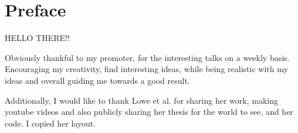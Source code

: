 \chapter*{Preface}
HELLO THERE!!

Obviously thankful to my promoter, for the interesting talks on a weekly basis.
Encouraging my creativity, find interesting ideas, while being realistic with my ideas and overall guiding me towards a good result.


Additionally, I would like to thank Lowe et al. for sharing her work, making youtube videos and also publicly sharing her thesis for the world to see, and her code. I copied her layout.